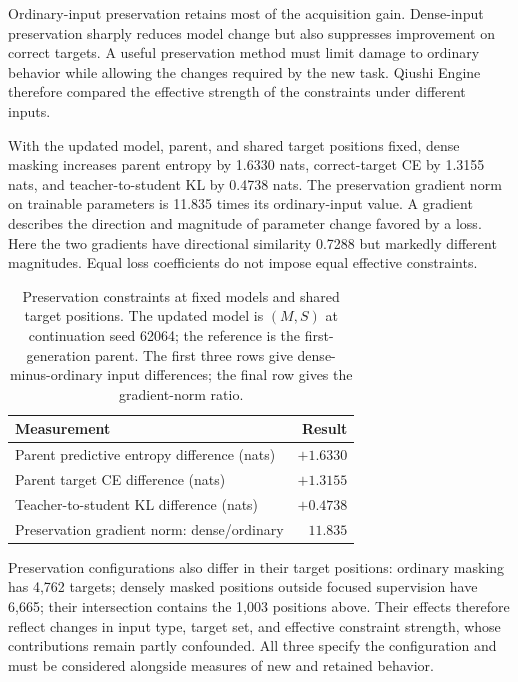 Ordinary-input preservation retains most of the acquisition gain. Dense-input preservation sharply reduces model change but also suppresses improvement on correct targets. A useful preservation method must limit damage to ordinary behavior while allowing the changes required by the new task. Qiushi Engine therefore compared the effective strength of the constraints under different inputs.

With the updated model, parent, and shared target positions fixed, dense masking increases parent entropy by 1.6330 nats, correct-target CE by 1.3155 nats, and teacher-to-student KL by 0.4738 nats. The preservation gradient norm on trainable parameters is 11.835 times its ordinary-input value. A gradient describes the direction and magnitude of parameter change favored by a loss. Here the two gradients have directional similarity 0.7288 but markedly different magnitudes. Equal loss coefficients do not impose equal effective constraints.

\begin{table}[htbp]
\caption{Preservation constraints at fixed models and shared target positions. The updated model is $(M,S)$ at continuation seed 62064; the reference is the first-generation parent. The first three rows give dense-minus-ordinary input differences; the final row gives the gradient-norm ratio.}
\label{tab:gradient_geometry}
\begin{tabularx}{\linewidth}{@{}Yr@{}}
\toprule Measurement & Result\\\midrule
Parent predictive entropy difference (nats) & $+1.6330$\\
Parent target CE difference (nats) & $+1.3155$\\
Teacher-to-student KL difference (nats) & $+0.4738$\\
Preservation gradient norm: dense/ordinary & $11.835$\\
\bottomrule
\end{tabularx}
\end{table}

Preservation configurations also differ in their target positions: ordinary masking has 4,762 targets; densely masked positions outside focused supervision have 6,665; their intersection contains the 1,003 positions above. Their effects therefore reflect changes in input type, target set, and effective constraint strength, whose contributions remain partly confounded. All three specify the configuration and must be considered alongside measures of new and retained behavior.

